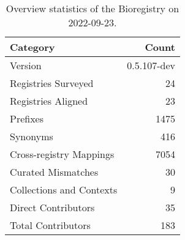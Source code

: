 \begin{table}
\centering
\caption{Overview statistics of the Bioregistry on 2022-09-23.}
\label{tab:bioregistry-summary}
\begin{tabular}{lr}
\toprule
                Category &       Count \\
\midrule
                 Version & 0.5.107-dev \\
     Registries Surveyed &          24 \\
      Registries Aligned &          23 \\
                Prefixes &        1475 \\
                Synonyms &         416 \\
 Cross-registry Mappings &        7054 \\
      Curated Mismatches &          30 \\
Collections and Contexts &           9 \\
     Direct Contributors &          35 \\
      Total Contributors &         183 \\
\bottomrule
\end{tabular}
\end{table}

